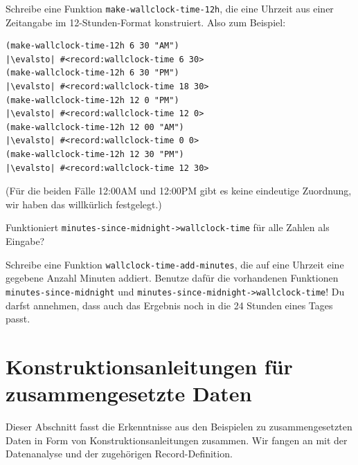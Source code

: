 \begin{aufgabeinline}
  Schreibe eine Funktion \lstinline{make-wallclock-time-12h}, die eine
  Uhrzeit aus einer Zeitangabe im 12-Stunden-Format konstruiert.  Also
  zum Beispiel:
\begin{lstlisting}
(make-wallclock-time-12h 6 30 "AM")
|\evalsto| #<record:wallclock-time 6 30>
(make-wallclock-time-12h 6 30 "PM")
|\evalsto| #<record:wallclock-time 18 30>
(make-wallclock-time-12h 12 0 "PM")
|\evalsto| #<record:wallclock-time 12 0>
(make-wallclock-time-12h 12 00 "AM")
|\evalsto| #<record:wallclock-time 0 0>
(make-wallclock-time-12h 12 30 "PM")
|\evalsto| #<record:wallclock-time 12 30>
\end{lstlisting}
  (Für die beiden Fälle 12:00AM und 12:00PM gibt es keine eindeutige
  Zuordnung, wir haben das willkürlich festgelegt.)
\end{aufgabeinline}

\begin{aufgabeinline}
  Funktioniert \lstinline{minutes-since-midnight->wallclock-time} für
  alle Zahlen als Eingabe?
\end{aufgabeinline}

\begin{aufgabeinline}
  Schreibe eine Funktion \lstinline{wallclock-time-add-minutes}, die
  auf eine Uhrzeit eine gegebene Anzahl Minuten addiert.
  Benutze
  dafür die vorhandenen Funktionen \lstinline{minutes-since-midnight} und
  \lstinline{minutes-since-midnight->wallclock-time}!  Du darfst
  annehmen, dass auch das Ergebnis noch in die 24 Stunden eines Tages
  passt.
\end{aufgabeinline}

\section{Konstruktionsanleitungen für zusammengesetzte Daten}

Dieser Abschnitt fasst die Erkenntnisse aus den Beispielen
zu zusammengesetzten Daten in Form von Konstruktionsanleitungen
zusammen.  Wir fangen an mit der Datenanalyse und der zugehörigen
Record-Definition.

